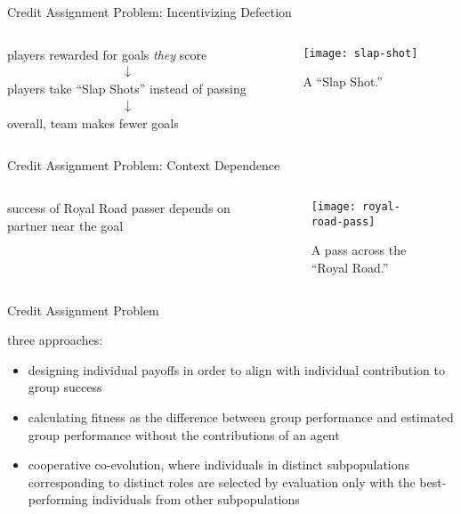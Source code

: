 \begin{frame}{Credit Assignment Problem: Incentivizing Defection}

\begin{columns}
\begin{column}{0.5\textwidth}
{\Large
players rewarded for goals \textit{they} score
\begin{align*}
\bm{\downarrow}
\end{align*}
players take ``Slap Shots'' instead of passing
\begin{align*}
\bm{\downarrow}
\end{align*}
overall, team makes fewer goals
}
\end{column}
\begin{column}{0.5\textwidth}
\begin{figure}
\texttt{[image: slap-shot]}
\caption{
A ``Slap Shot.''
}
\label{fig:slap-shot}
\end{figure}
\end{column}
\end{columns}

\end{frame}

\begin{frame}{Credit Assignment Problem: Context Dependence}

\begin{columns}
\begin{column}{0.5\textwidth}
\Large
success of Royal Road passer depends on partner near the goal
\end{column}
\begin{column}{0.5\textwidth}
\begin{figure}
\texttt{[image: royal-road-pass]}
\caption{
A pass across the ``Royal Road.''
}
\label{fig:royal-road-pass}
\end{figure}
\end{column}
\end{columns}


\end{frame}


\begin{frame}{Credit Assignment Problem}

three approaches:
\begin{itemize}
\item designing individual payoffs in order to align with individual contribution to group success \cite{waibel2009genetic}
\item calculating fitness as the difference between group performance and estimated group performance without the contributions of an agent \cite{knudson2010coevolution}
\item cooperative co-evolution, where individuals in distinct subpopulations corresponding to distinct roles are selected by evaluation only with the best-performing individuals from other subpopulations \cite{gomes2015cooperative}
\end{itemize}

\end{frame}
